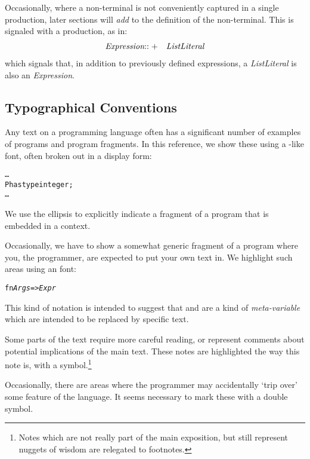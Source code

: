 Occasionally, where a non-terminal is not conveniently captured in a single production, later sections will \emph{add} to the definition of the non-terminal. This is signaled with a \arrowplus{} production, as in:
\begin{eqnarray*}
\emph{Expression}&{\rm ::+}&\emph{ListLiteral}
\end{eqnarray*}
which signals that, in addition to previously defined expressions, a \emph{ListLiteral} is also an \emph{Expression}.

\subsection{Typographical Conventions}
Any text on a programming language often has a significant number of examples of programs and program fragments. In this reference, we show these using a -like font, often broken out in a display form:
\begin{alltt}
\ldots
P has type integer;
\ldots
\end{alltt}
We use the \q{\ldots} ellipsis to explicitly indicate a fragment of a program that is embedded in a context.

Occasionally, we have to show a somewhat generic fragment of a program where you, the programmer, are expected to put your own text in. We highlight such areas using an  font:
\begin{alltt}
fn \emph{Args} => \emph{Expr}
\end{alltt}
This kind of notation is intended to suggest that  and  are a kind of \emph{meta-variable} which are intended to be replaced by specific text.

\begin{aside}
Some parts of the text require more careful reading, or represent comments about potential implications of the main text. These notes are highlighted the way this note is, with a \dbend{} symbol.\footnote{Notes which are not really part of the main exposition, but still represent nuggets of wisdom are relegated to footnotes.}
\end{aside}
\begin{aside}
\begin{aside}
Occasionally, there are areas where the programmer may accidentally `trip over' some feature of the language. It seems necessary to mark these with a double \dbend{}\dbend{} symbol.
\end{aside}
\end{aside}